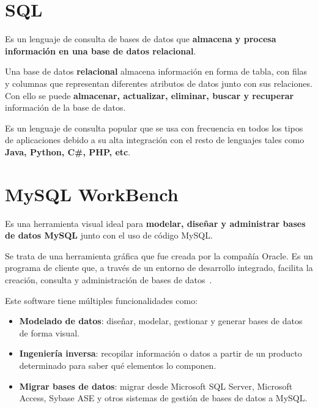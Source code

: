 \documentclass[a4paper, 12pt]{book}
\begin{document}
\section{SQL} 
\label{sec:sql}
Es un lenguaje de consulta de bases de datos que \textbf{almacena y procesa información en una base de datos relacional}. 

Una base de datos \textbf{relacional} almacena información en forma de tabla, con filas y columnas que representan diferentes atributos de datos junto con sus relaciones. Con ello se puede \textbf{almacenar, actualizar, eliminar, buscar y recuperar} información de la base de datos.

Es un lenguaje de consulta popular que se usa con frecuencia en todos los tipos de aplicaciones debido a su alta integración con el resto de lenguajes tales como \textbf{Java, Python, C\#, PHP, etc}.

\section{MySQL WorkBench} 
\label{sec:mysqlworkbench}

Es una herramienta visual ideal para \textbf{modelar, diseñar y administrar bases de datos MySQL} junto con el uso de código MySQL.

Se trata de una herramienta gráfica que fue creada por la compañía Oracle.
Es un programa de cliente que, a través de un entorno de desarrollo integrado, facilita la creación, consulta y administración de bases de datos~\cite{mysql:_workbench}. 

Este software tiene múltiples funcionalidades como:
\begin{itemize}
	\item \textbf {Modelado de datos}: diseñar, modelar, gestionar y generar bases de datos de forma visual. 
	\item \textbf {Ingeniería inversa}: recopilar información o datos a partir de un producto determinado para saber qué elementos lo componen. 
	\item \textbf {Migrar bases de datos}: migrar desde Microsoft SQL Server, Microsoft Access, Sybase ASE y otros sistemas de gestión de bases de datos a MySQL.
\end{itemize}
\end{document}
